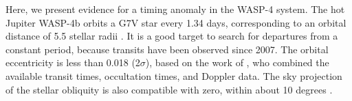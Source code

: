 \documentclass[12pt,twocolumn,tighten]{aastex62}
\begin{document}
%
%

Here, we present evidence for a timing anomaly in the WASP-4 system.
The hot Jupiter WASP-4b orbits a G7V star every 1.34 days,
corresponding to an orbital distance of 5.5 stellar radii
\citep{wilson_wasp-4b_2008,huitson_gemini_2017}.  It is a good target
to search for departures from a constant period, because transits have
been observed since 2007.  The orbital eccentricity is less than 0.018
(2$\sigma$), based on the work of \cite{knutson_friends_2014}, who
combined the available transit times, occultation times, and Doppler
data.  The sky projection of the stellar obliquity is also compatible
with zero, within about 10 degrees
\citep{triaud_spin-orbit_2010,sanchis-ojeda_starspots_2011}.
\end{document}
